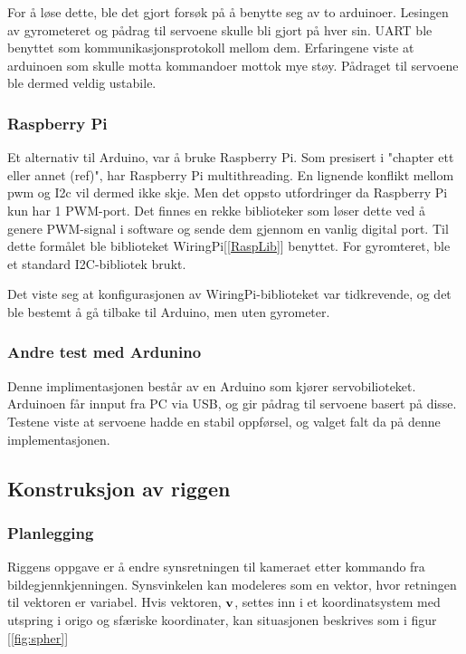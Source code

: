 For å løse dette, ble det gjort forsøk på å benytte seg av to arduinoer. Lesingen av gyrometeret og pådrag til servoene skulle bli gjort på hver sin. UART ble benyttet som kommunikasjonsprotokoll mellom dem. Erfaringene viste at arduinoen som skulle motta kommandoer mottok mye støy. Pådraget til servoene ble dermed veldig ustabile. 

\subsubsection{Raspberry Pi}
Et alternativ til Arduino, var å bruke Raspberry Pi. Som presisert i "chapter ett eller annet (ref)", har Raspberry Pi multithreading. En lignende konflikt mellom pwm og I2c vil dermed ikke skje. Men det oppsto utfordringer da Raspberry Pi kun har 1 PWM-port. Det finnes en rekke biblioteker som løser dette ved å genere PWM-signal i software og sende dem gjennom en vanlig digital port. Til dette formålet ble biblioteket WiringPi[\ref{RaspLib}] benyttet. For gyromteret, ble et standard I2C-bibliotek brukt. 

Det viste seg at konfigurasjonen av WiringPi-biblioteket var tidkrevende, og det ble bestemt å gå tilbake til Arduino, men uten gyrometer.  

\subsubsection{Andre test med Ardunino}
Denne implimentasjonen består av en Arduino som kjører servobilioteket. Arduinoen får innput fra PC via USB, og gir pådrag til servoene basert på disse. Testene viste at servoene hadde en stabil oppførsel, og valget falt da på denne implementasjonen.   

\subsection{Konstruksjon av riggen}

\subsubsection{Planlegging}
Riggens oppgave er å endre synsretningen til kameraet etter kommando fra bildegjennkjenningen. Synsvinkelen kan modeleres som en vektor, hvor retningen til vektoren er variabel. Hvis vektoren, $\bf{v}$, settes inn i et koordinatsystem med utspring i origo og sfæriske koordinater, kan situasjonen beskrives som i figur [\ref{fig:spher}]

